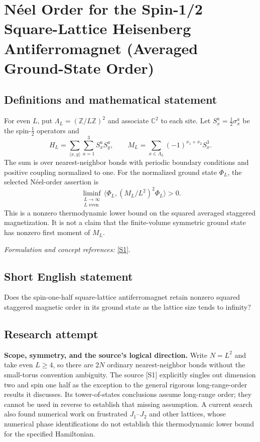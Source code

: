 \documentclass[11pt]{article}
\begin{document}
\section*{\texorpdfstring{Néel Order for the Spin-1/2 Square-Lattice Heisenberg Antiferromagnet (Averaged Ground-State Order)}{Néel Order for the Spin-1/2 Square-Lattice Heisenberg Antiferromagnet (Averaged Ground-State Order)}}\label{30006859}
\subsection{Definitions and mathematical statement}
For even $L$, put $\Lambda_L=({\mathbb{Z}}/L{\mathbb{Z}})^2$ and associate ${\mathbb{C}}^2$ to each site. Let $S_x^a=\frac12\sigma_x^a$ be the spin-$\frac12$ operators and
\[
 H_L=\sum_{\langle x,y\rangle}\sum_{a=1}^3S_x^aS_y^a,
 \qquad M_L=\sum_{x\in\Lambda_L}(-1)^{x_1+x_2}S_x^3.
\]
The sum is over nearest-neighbor bonds with periodic boundary conditions and positive coupling normalized to one. For the normalized ground state $\Phi_L$, the selected N\'eel-order assertion is
\[
 \liminf_{\substack{L\to\infty\\L\text{ even}}}
 \langle\Phi_L,(M_L/L^2)^2\Phi_L\rangle>0.
\]
This is a nonzero thermodynamic lower bound on the squared averaged staggered magnetization. It is not a claim that the finite-volume symmetric ground state has nonzero first moment of $M_L$.
\par\smallskip\textit{Formulation and concept references:} \href{https://arxiv.org/pdf/1807.05847}{[S1]}.

\subsection{Short English statement}
Does the spin-one-half square-lattice antiferromagnet retain nonzero squared staggered magnetic order in its ground state as the lattice size tends to infinity?
\subsection{Research attempt}
\textbf{Scope, symmetry, and the source's logical direction.}
Write $N=L^2$ and take even $L\geq4$, so there are $2N$ ordinary
nearest-neighbor bonds without the small-torus convention ambiguity.
The source [S1] explicitly singles out dimension two and spin one half as the
exception to the general rigorous long-range-order results it discusses.
Its tower-of-states conclusions assume long-range order; they cannot be used
in reverse to establish that missing assumption.  A current search also found
numerical work on frustrated $J_1$--$J_2$ and other lattices, whose numerical
phase identifications do not establish this thermodynamic lower bound for the
specified Hamiltonian.
\end{document}
